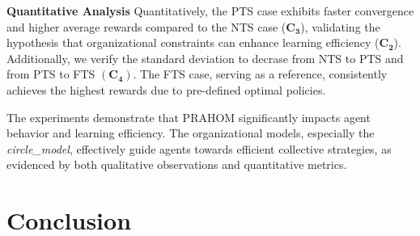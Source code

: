 \documentclass[runningheads]{llncs}
\theoremstyle{freethm}
\theoremstyle{proofoutline}
\newcounter{relation}
\newcounter{proof}
\begin{document}

\textbf{Quantitative Analysis} \quad Quantitatively, the PTS case exhibits faster convergence and higher average rewards compared to the NTS case ($\mathbf{C_3}$), validating the hypothesis that organizational constraints can enhance learning efficiency ($\mathbf{C_2}$). Additionally, we verify the standard deviation to decrase from NTS to PTS and from PTS to FTS $(\mathbf{C_4})$.
The FTS case, serving as a reference, consistently achieves the highest rewards due to pre-defined optimal policies.

The experiments demonstrate that PRAHOM significantly impacts agent behavior and learning efficiency. The organizational models, especially the \textit{circle\_model}, effectively guide agents towards efficient collective strategies, as evidenced by both qualitative observations and quantitative metrics.


\section{Conclusion}




\end{document}
